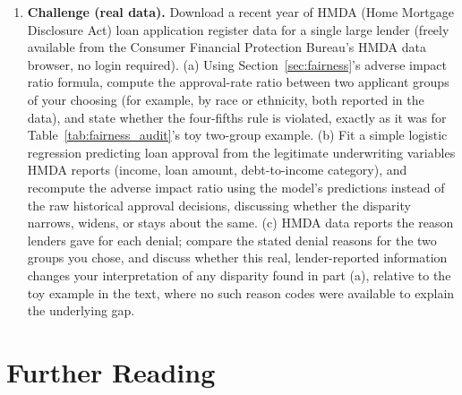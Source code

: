 \documentclass[../ai_in_finance]{subfiles}
\begin{document}
\begin{enumerate}
    \item \textbf{Challenge (real data).} Download a recent year of HMDA (Home Mortgage Disclosure Act) loan application register data for a single large lender (freely available from the Consumer Financial Protection Bureau's HMDA data browser, no login required). (a) Using Section~\ref{sec:fairness}'s adverse impact ratio formula, compute the approval-rate ratio between two applicant groups of your choosing (for example, by race or ethnicity, both reported in the data), and state whether the four-fifths rule is violated, exactly as it was for Table~\ref{tab:fairness_audit}'s toy two-group example. (b) Fit a simple logistic regression predicting loan approval from the legitimate underwriting variables HMDA reports (income, loan amount, debt-to-income category), and recompute the adverse impact ratio using the model's predictions instead of the raw historical approval decisions, discussing whether the disparity narrows, widens, or stays about the same. (c) HMDA data reports the reason lenders gave for each denial; compare the stated denial reasons for the two groups you chose, and discuss whether this real, lender-reported information changes your interpretation of any disparity found in part (a), relative to the toy example in the text, where no such reason codes were available to explain the underlying gap.
\end{enumerate}

\section{Further Reading}
\end{document}
